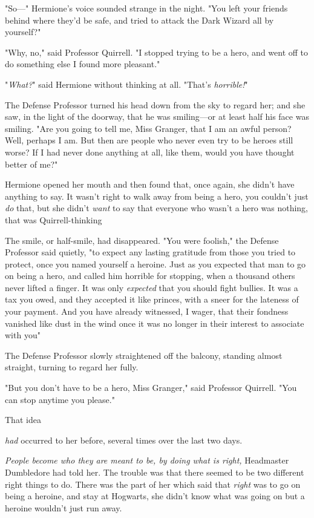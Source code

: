 "So\mbox{---}" Hermione's voice sounded strange in the night. "You left your friends
behind where they'd be safe, and tried to attack the Dark Wizard all by
yourself?"

"Why, no," said Professor Quirrell. "I stopped trying to be a hero, and went
off to do something else I found more pleasant."

"\emph{What?}" said Hermione without thinking at all. "That's \emph{horrible!}"

The Defense Professor turned his head down from the sky to regard her; and she
saw, in the light of the doorway, that he was smiling---or at least half his
face was smiling. "Are you going to tell me, Miss Granger, that I am an awful
person? Well, perhaps I am. But then are people who never even try to be heroes
still worse? If I had never done anything at all, like them, would you have
thought better of me?"

Hermione opened her mouth and then found that, once again, she didn't have
anything to say. It wasn't right to walk away from being a hero, you couldn't
just \emph{do} that, but she didn't \emph{want} to say that everyone who wasn't
a hero was nothing, that was Quirrell-thinking{\el}

The smile, or half-smile, had disappeared. "You were foolish," the Defense
Professor said quietly, "to expect any lasting gratitude from those you tried
to protect, once you named yourself a heroine. Just as you expected that man to
go on being a hero, and called him horrible for stopping, when a thousand
others never lifted a finger. It was only \emph{expected} that you should fight
bullies. It was a tax you owed, and they accepted it like princes, with a sneer
for the lateness of your payment. And you have already witnessed, I wager, that
their fondness vanished like dust in the wind once it was no longer in their
interest to associate with you{\el}"

The Defense Professor slowly straightened off the balcony, standing almost
straight, turning to regard her fully.

"But you don't have to be a hero, Miss Granger," said Professor Quirrell. "You
can stop anytime you please."

That idea{\el}

{\el} \emph{had} occurred to her before, several times over the last two days.

\emph{People become who they are meant to be, by doing what is right,}
Headmaster Dumbledore had told her. The trouble was that there seemed to be two
different right things to do. There was the part of her which said that
\emph{right} was to go on being a heroine, and stay at Hogwarts, she didn't
know what was going on but a heroine wouldn't just run away.

